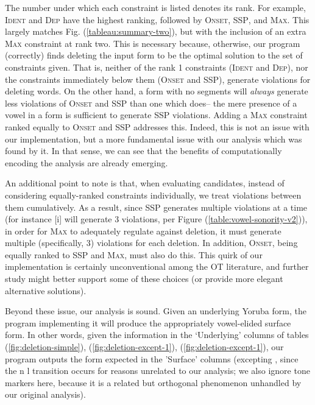 \documentclass[12pt]{article}
\newcommand{\ident}{\textsc{Ident}}
\newcommand{\maxc}{\textsc{Max}}
\newcommand{\ssp}{\textsc{SSP}}
\newcommand{\dep}{\textsc{Dep}}
\newcommand{\onset}{\textsc{Onset}}
\newcommand{\pref}[1]{(\ref{#1})}
\begin{document}
The number under which each constraint is listed denotes its rank. For example,
\ident{} and \dep{} have the highest ranking, followed by \onset{}, \ssp{}, and
\maxc{}. This largely matches Fig. \pref{tableau:summary-two}, but with the
inclusion of an extra \maxc{} constraint at rank two. This is necessary
because, otherwise, our program (correctly) finds deleting the input form to be
the optimal solution to the set of constraints given. That is, neither of the
rank 1 constraints (\ident{} and \dep{}), nor the constraints immediately below
them (\onset{} and \ssp{}), generate violations for deleting words. On the
other hand, a form with no segments will \textit{always} generate less
violations of \onset{} and \ssp{} than one which does-- the mere presence of a
vowel in a form is sufficient to generate \ssp{} violations. Adding a \maxc{}
constraint ranked equally to \onset{} and \ssp{} addresses this. Indeed, this
is not an issue with our implementation, but a more fundamental issue with our
analysis which was found by it. In that sense, we can see that the benefits of
computationally encoding the analysis are already emerging.

An additional point to note is that, when evaluating candidates, instead of
considering equally-ranked constraints individually, we treat violations
between them cumulatively. As a result, since \ssp{} generates multiple
violations at a time (for instance [i] will generate 3 violations, per Figure
\pref{table:vowel-sonority-v2}), in order for \maxc{} to adequately regulate
against deletion, it must generate multiple (specifically, 3) violations for
each deletion. In addition, \onset{}, being equally ranked to \ssp{} and
\maxc{}, must also do this. This quirk of our implementation is certainly
unconventional among the OT literature, and further study might better support
some of these choices (or provide more elegant alternative solutions).

Beyond these issue, our analysis is sound. Given an underlying Yoruba form, the
program implementing it will produce the appropriately vowel-elided surface
form. In other words, given the information in the `Underlying' columns of
tables \pref{fig:deletion-simple}, \pref{fig:deletion-except-1},
\pref{fig:deletion-except-1}, our program outputs the form expected in the
'Surface' columns (excepting  \rightarrow{}
\textipa{[l\'oko]}, since the n \rightarrow{} l transition occurs for reasons
unrelated to our analysis; we also ignore tone markers here, because it is a
related but orthogonal phenomenon unhandled by our original analysis).
\end{document}

